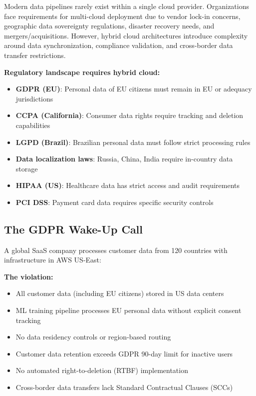 Modern data pipelines rarely exist within a single cloud provider. Organizations face requirements for multi-cloud deployment due to vendor lock-in concerns, geographic data sovereignty regulations, disaster recovery needs, and mergers/acquisitions. However, hybrid cloud architectures introduce complexity around data synchronization, compliance validation, and cross-border data transfer restrictions.

\textbf{Regulatory landscape requires hybrid cloud:}
\begin{itemize}
    \item \textbf{GDPR (EU)}: Personal data of EU citizens must remain in EU or adequacy jurisdictions
    \item \textbf{CCPA (California)}: Consumer data rights require tracking and deletion capabilities
    \item \textbf{LGPD (Brazil)}: Brazilian personal data must follow strict processing rules
    \item \textbf{Data localization laws}: Russia, China, India require in-country data storage
    \item \textbf{HIPAA (US)}: Healthcare data has strict access and audit requirements
    \item \textbf{PCI DSS}: Payment card data requires specific security controls
\end{itemize}

\subsection{The GDPR Wake-Up Call}

A global SaaS company processes customer data from 120 countries with infrastructure in AWS US-East:

\textbf{The violation:}
\begin{itemize}
    \item All customer data (including EU citizens) stored in US data centers
    \item ML training pipeline processes EU personal data without explicit consent tracking
    \item No data residency controls or region-based routing
    \item Customer data retention exceeds GDPR 90-day limit for inactive users
    \item No automated right-to-deletion (RTBF) implementation
    \item Cross-border data transfers lack Standard Contractual Clauses (SCCs)
\end{itemize}

